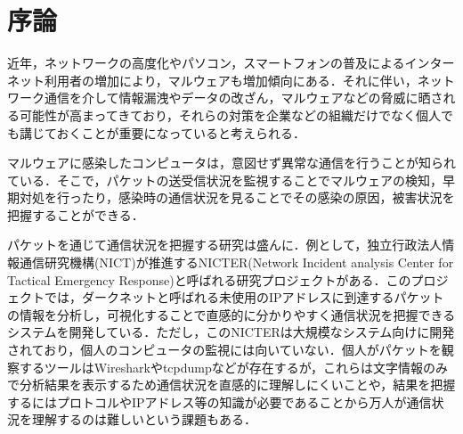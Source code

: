 \documentclass{thesis}
\begin{document}
\lstset{
 	language = Python,
 	breaklines = true,
 	basicstyle = \ttfamily\scriptsize,
 	tabsize = 1,
}


\tableofcontents

\chapter{序論}

近年，ネットワークの高度化やパソコン，スマートフォンの普及によるインターネット利用者の増加により，マルウェアも増加傾向にある\cite{McafeeLabs脅威レポート}．それに伴い，ネットワーク通信を介して情報漏洩やデータの改ざん，マルウェアなどの脅威に晒される可能性が高まってきており，それらの対策を企業などの組織だけでなく個人でも講じておくことが重要になっていると考えられる．

マルウェアに感染したコンピュータは，意図せず異常な通信を行うことが知られている．そこで，パケットの送受信状況を監視することでマルウェアの検知，早期対処を行ったり，感染時の通信状況を見ることでその感染の原因，被害状況を把握することができる．

パケットを通じて通信状況を把握する研究は盛んに．例として，独立行政法人情報通信研究機構(NICT)が推進するNICTER(Network Incident analysis Center for Tactical Emergency Response)\cite{NICTER}と呼ばれる研究プロジェクトがある．このプロジェクトでは，ダークネットと呼ばれる未使用のIPアドレスに到達するパケットの情報を分析し，可視化することで直感的に分かりやすく通信状況を把握できるシステムを開発している．ただし，このNICTERは大規模なシステム向けに開発されており，個人のコンピュータの監視には向いていない．個人がパケットを観察するツールはWireshark\cite{Wireshark}やtcpdump\cite{tcpdump}などが存在するが，これらは文字情報のみで分析結果を表示するため通信状況を直感的に理解しにくいことや，結果を把握するにはプロトコルやIPアドレス等の知識が必要であることから万人が通信状況を理解するのは難しいという課題もある．
\end{document}
